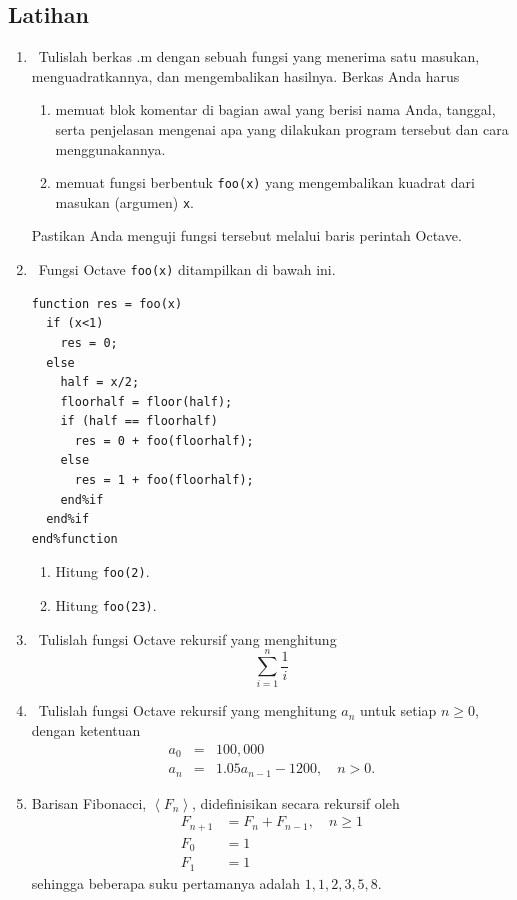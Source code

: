 \subsection{Latihan}
\begin{enumerate}
\item \octave\ Tulislah berkas .m dengan sebuah fungsi yang menerima satu
masukan, menguadratkannya, dan mengembalikan hasilnya. Berkas Anda
harus

\begin{enumerate}
\item memuat blok komentar di bagian awal yang berisi nama Anda, tanggal,
serta penjelasan mengenai apa yang dilakukan program tersebut dan
cara menggunakannya.
\item memuat fungsi berbentuk \texttt{foo(x)} yang mengembalikan kuadrat
dari masukan (argumen) \texttt{x}.
\end{enumerate}
Pastikan Anda menguji fungsi tersebut melalui baris perintah Octave.
\item \octave\ Fungsi Octave \texttt{foo(x)} ditampilkan di bawah ini.

\begin{verbatim}
function res = foo(x)
  if (x<1)
    res = 0;
  else
    half = x/2;
    floorhalf = floor(half);
    if (half == floorhalf)
      res = 0 + foo(floorhalf);
    else
      res = 1 + foo(floorhalf);
    end%if
  end%if
end%function
\end{verbatim}
\begin{enumerate}
\item Hitung \texttt{foo(2)}.
\item Hitung \texttt{foo(23)}.
\end{enumerate}
\item \octave\ Tulislah fungsi Octave rekursif yang menghitung 
\[
\sum_{i=1}^{n}\frac{1}{i}
\]
\item \octave\ Tulislah fungsi Octave rekursif yang menghitung $a_{n}$
untuk setiap $n\geq0$, dengan ketentuan
\begin{eqnarray*}
a_{0} & = & 100,000\\
a_{n} & = & 1.05a_{n-1}-1200,\quad n>0.
\end{eqnarray*}
\item \label{recursive1}Barisan Fibonacci, $\left\langle F_{n}\right\rangle $,
didefinisikan secara rekursif oleh
\begin{align*}
F_{n+1} & =F_{n}+F_{n-1},\quad n\geq1\\
F_{0} & =1\\
F_{1} & =1
\end{align*}
sehingga beberapa suku pertamanya adalah $1,1,2,3,5,8$. 


\end{enumerate}
